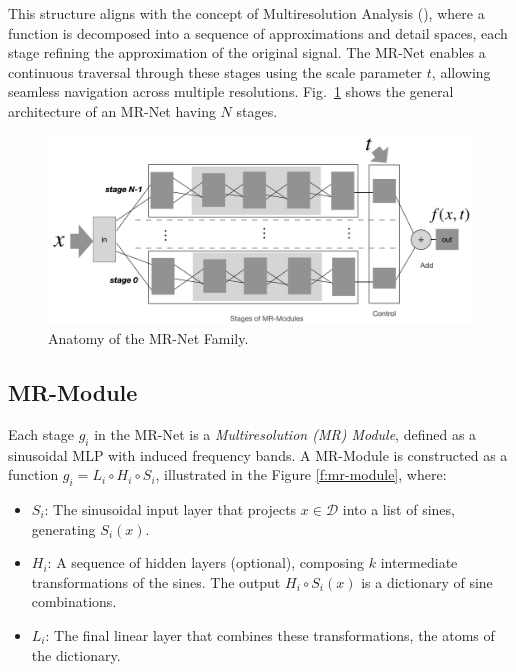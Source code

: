 This structure aligns with the concept of Multiresolution Analysis (\cite{mallat-mr89}), where a function is decomposed into a sequence of approximations and detail spaces, each stage refining the approximation of the original signal. The MR-Net enables a continuous traversal through these stages using the scale parameter \(t\), allowing seamless navigation across multiple resolutions. Fig.~\ref{f:mrnet-arch} shows the general architecture of an MR-Net having \(N\) stages.

\begin{figure}[!h]
\centering
\includegraphics[width=0.9\linewidth]{img/ch4/mr-net-stages-v2.png}
\caption{Anatomy of the MR-Net Family.}
\label{f:mrnet-arch}
\end{figure}


\subsection{MR-Module}
\label{s-mr-module}

Each stage \( g_i \) in the MR-Net is a \textit{Multiresolution (MR) Module}, defined as a sinusoidal MLP with induced frequency bands. A MR-Module is constructed as a function \( g_i = L_i \circ H_i \circ S_i \), illustrated in the Figure \ref{f:mr-module}, where:

\begin{itemize}
    \item \( S_i \): The sinusoidal input layer that projects \( x \in \mathcal{D} \) into a list of sines, generating \( S_i(x) \).
    \item \( H_i \): A sequence of hidden layers (optional), composing \( k \) intermediate transformations of the sines. The output $H_i\circ S_i(x)$ is a dictionary of sine combinations.
    \item \( L_i \): The final linear layer that combines these transformations, the atoms of the dictionary.
\end{itemize}


